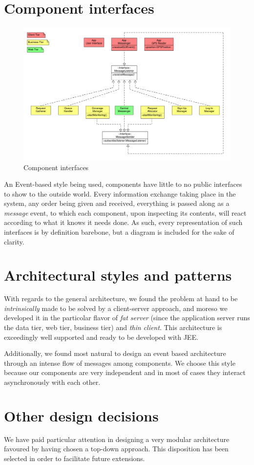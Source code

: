 
\section{Component interfaces}
\begin{figure}
\centering
\includegraphics[width=\textwidth]{tex-images/interfaces}
\caption{Component interfaces}
\end{figure}

An Event-based style being used, components have little to no public interfaces to show to the outside world. Every information exchange taking place in the system, any order being given and received, everything is passed along as a \emph{message} event, to which each component, upon inspecting its contents, will react according to what it knows it needs done. As such, every representation of such interfaces is by definition barebone, but a diagram is included for the sake of clarity.


\section{Architectural styles and patterns}
With regards to the general architecture, we found the problem at hand to be \emph{intrinsically} made to be solved by a client-server approach, and moreso we developed it in the particolar flavor of \emph{fat server} (since the application server runs the data tier, web tier, business tier) and \emph{thin client}. This architecture is exceedingly well supported and ready to be developed with JEE.

Additionally, we found most natural to design an event based architecture through an intense flow of messages among components. We choose this style because our components are very independent and in most of cases they interact asynchronously with each other.


\section{Other design decisions}
We have paid particular attention in designing a very modular architecture favoured by having chosen a top-down approach. This disposition has been selected in order to facilitate future extensions.